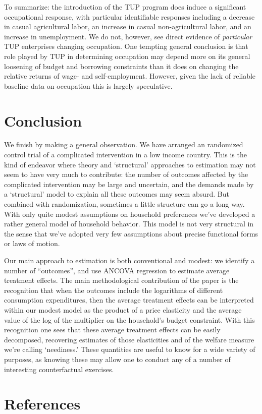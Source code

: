 \documentclass[12pt,letterpaper]{article}
\begin{document}
To summarize: the introduction of the TUP program does induce a
significant occupational response, with particular identifiable
responses including a decrease in casual agricultural labor, an
increase in casual non-agricultural labor, and an increase in
unemployment.  We do not, however, see direct evidence of \emph{particular}
TUP enterprises changing occupation. One tempting general conclusion
is that role played by TUP in determining occupation may depend more
on its general loosening of budget and borrowing constraints than it
does on changing the relative returns of wage- and self-employment.
However, given the lack of reliable baseline data on occupation this is largely
speculative. 


\section{Conclusion}
\label{sec:orgheadline19}

We finish by making a general observation.  We have arranged an
randomized control trial of a complicated intervention in a low income
country.  This is the kind of endeavor where theory and `structural'
approaches to estimation may not seem to have very much to contribute:
the number of outcomes affected by the complicated intervention may be
large and uncertain, and the demands made by a `structural' model to
explain all these outcomes may seem absurd.  But combined with
randomization, sometimes a little structure can go a long way.  With
only quite modest assumptions on household preferences we've developed
a rather general model of household behavior.  This model is 
not very structural in the sense that we've adopted very few
assumptions about precise functional forms or laws of motion.  

Our main approach to estimation is both conventional and modest: we
identify a number of ``outcomes'', and use ANCOVA regression to estimate
average treatment effects.  The main methodological contribution of
the paper is the recognition that when the outcomes include the
logarithms of different consumption expenditures, then the average
treatment effects can be interpreted within our modest model as the
product of a price elasticity and the average value of the log of the
multiplier on the household's budget constraint.  With this
recognition one sees that these average treatment effects can be
easily decomposed, recovering estimates of those elasticities and of
the welfare measure we're calling `neediness.'  These quantities are
useful to know for a wide variety of purposes, as knowing these may
allow one to conduct any of a number of interesting counterfactual
exercises.

\section{References}
\label{sec:orgheadline20}
\renewcommand{\refname}{}
\printbibliography
\end{document}
